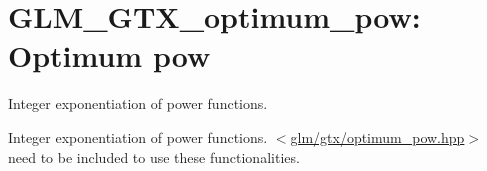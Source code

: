 \hypertarget{group__gtx__optimum__pow}{\section{\-G\-L\-M\-\_\-\-G\-T\-X\-\_\-optimum\-\_\-pow\-: \-Optimum pow}
\label{group__gtx__optimum__pow}
}


\-Integer exponentiation of power functions.  


\-Integer exponentiation of power functions. $<$\hyperlink{optimum__pow_8hpp}{glm/gtx/optimum\-\_\-pow.\-hpp}$>$ need to be included to use these functionalities. 